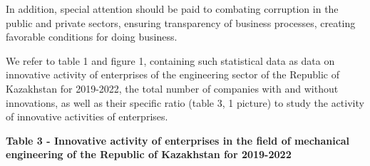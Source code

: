 In addition, special attention should be paid to combating corruption in
the public and private sectors, ensuring transparency of business
processes, creating favorable conditions for doing business.

We refer to table 1 and figure 1, containing such statistical data as
data on innovative activity of enterprises of the engineering sector of
the Republic of Kazakhstan for 2019-2022, the total number of companies
with and without innovations, as well as their specific ratio (table 3,
1 picture) to study the activity of innovative activities of
enterprises.

{\bfseries Table 3 - Innovative activity of enterprises in the field of
mechanical engineering of the Republic of Kazakhstan for 2019-2022}


